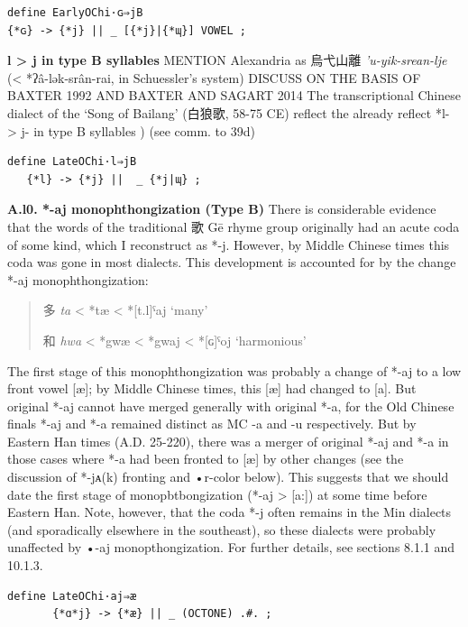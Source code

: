 \documentclass[xetex, svgnames, 12pt]{scrartcl}
\newcounter{para}
\newcommand\mypara[1]{\par\refstepcounter{para}\textbf{\thepara\space#1\space}}
\begin{document}
\begin{verbatim}
define EarlyOChi·ɢ⇒jB
{*ɢ} -> {*j} || _ [{*j}|{*ɰ}] VOWEL ;  
\end{verbatim}

\mypara{l > j in type B syllables}
MENTION Alexandria as 烏弋山離 \textit{'u-yik-srean-lje} (< *ʔâ-lək-srân-rai, in Schuessler’s system)
DISCUSS ON THE BASIS OF BAXTER 1992 AND BAXTER AND SAGART 2014
The transcriptional Chinese dialect of the `Song of Bailang' (白狼歌, 58-75 CE) reflect the already reflect *l- > j- in type B syllables \citep[197]{Baxter1992}) \citep{Hill2017Bailang}
(see comm. to 39d)

\begin{verbatim}
define LateOChi·l⇒jB 
   {*l} -> {*j} ||  _ {*j|ɰ} ; 
\end{verbatim} 


\mypara{A.l0. *-aj monophthongization (Type B)}
 There is considerable evidence that the words of the traditional 歌 Gē rhyme group
 originally had an acute coda of some kind, which I reconstruct as *-j. However, by Middle
 Chinese times this coda was gone in most dialects. This development is accounted for by
 the change *-aj monophthongization:
 \begin{quote}
 多 %
 \textit{ta} < *tæ < *[t.l]ˤaj `many'

 和 %
 \textit{hwa} < *gwæ < *gwaj < *[ɢ]ˤoj `harmonious'
 \end{quote}
 The first stage of this monophthongization was probably a change of *-aj to a low front
 vowel [æ]; by Middle Chinese times, this [æ] had changed to [a]. But original *-aj cannot
 have merged generally with original *-a, for the Old Chinese finals *-aj and *-a remained
 distinct as MC -a and -u respectively. But by Eastern Han times (A.D. 25-220), there was a
 merger of original *-aj and *-a in those cases where *-a had been fronted to [æ] by other
 changes (see the discussion of *-jᴀ(k) fronting and •r-color below). This suggests that we
 should date the first stage of monopbtbongization (*-aj > [a:]) at some time before
 Eastern Han. Note, however, that the coda *-j often remains in the Min dialects (and
 sporadically elsewhere in the southeast), so these dialects were probably unaffected by •-aj
 monopthongization. For further details, see sections 8.1.1 and 10.1.3.
\begin{verbatim}
define LateOChi·aj⇒æ 
       {*ɑ*j} -> {*æ} || _ (OCTONE) .#. ; 
\end{verbatim} 
\end{document}
